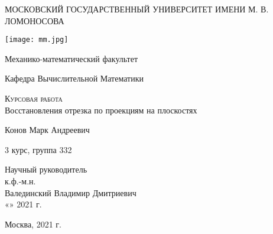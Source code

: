 \begin{titlepage}
  \begin{center}
    \large
 
 	МОСКОВСКИЙ ГОСУДАРСТВЕННЫЙ УНИВЕРСИТЕТ ИМЕНИ М. В. ЛОМОНОСОВА

    \texttt{[image: mm.jpg]} 
     
    Механико-математический факультет
    \vspace{0.25cm}

    Кафедра Вычислительной Математики
    \vspace{0.25cm}
 
    \textsc{Курсовая работа}\\[5mm]
     
    {\LARGE Восстановления отрезка по проекциям на плоскостях}
    \bigskip

    Конов Марк Андреевич
    \vspace{0.25cm}
     
    3 курс, группа 332
\end{center}
\vfill
 
\newlength{\ML}
\hfill\begin{minipage}{0.5\textwidth}
  \begin{flushright}
     Научный руководитель\\
    к.ф.-м.н. \\
    Валединский Владимир Дмитриевич\\
    «\underline{\hspace{0.7cm}}» \underline{\hspace{2cm}} 2021 г.
  \end{flushright}
\end{minipage}%
\vfill
\bigskip
 
\begin{center}
  Москва, 2021 г.
\end{center}
\end{titlepage}
\newpage